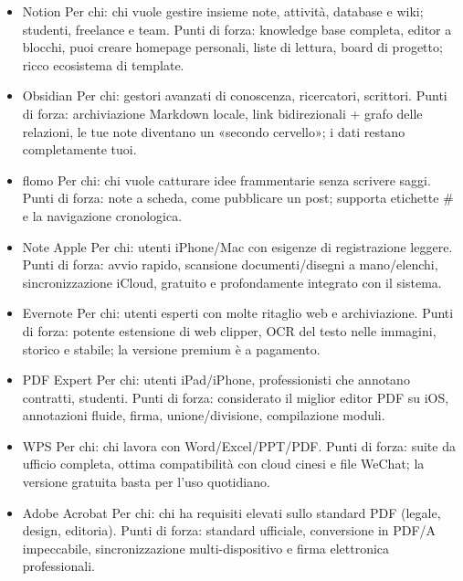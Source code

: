 \begin{itemize}
  \item Notion Per chi: chi vuole gestire insieme note, attività, database e wiki; studenti, freelance e team. Punti di forza: knowledge base completa, editor a blocchi, puoi creare homepage personali, liste di lettura, board di progetto; ricco ecosistema di template.
  \item Obsidian Per chi: gestori avanzati di conoscenza, ricercatori, scrittori. Punti di forza: archiviazione Markdown locale, link bidirezionali + grafo delle relazioni, le tue note diventano un «secondo cervello»; i dati restano completamente tuoi.
  \item flomo Per chi: chi vuole catturare idee frammentarie senza scrivere saggi. Punti di forza: note a scheda, come pubblicare un post; supporta etichette \# e la navigazione cronologica.
  \item Note Apple Per chi: utenti iPhone/Mac con esigenze di registrazione leggere. Punti di forza: avvio rapido, scansione documenti/disegni a mano/elenchi, sincronizzazione iCloud, gratuito e profondamente integrato con il sistema.
  \item Evernote Per chi: utenti esperti con molte ritaglio web e archiviazione. Punti di forza: potente estensione di web clipper, OCR del testo nelle immagini, storico e stabile; la versione premium è a pagamento.
\end{itemize}


\begin{itemize}
  \item PDF Expert Per chi: utenti iPad/iPhone, professionisti che annotano contratti, studenti. Punti di forza: considerato il miglior editor PDF su iOS, annotazioni fluide, firma, unione/divisione, compilazione moduli.
  \item WPS Per chi: chi lavora con Word/Excel/PPT/PDF. Punti di forza: suite da ufficio completa, ottima compatibilità con cloud cinesi e file WeChat; la versione gratuita basta per l'uso quotidiano.
  \item Adobe Acrobat Per chi: chi ha requisiti elevati sullo standard PDF (legale, design, editoria). Punti di forza: standard ufficiale, conversione in PDF/A impeccabile, sincronizzazione multi-dispositivo e firma elettronica professionali.
\end{itemize}


